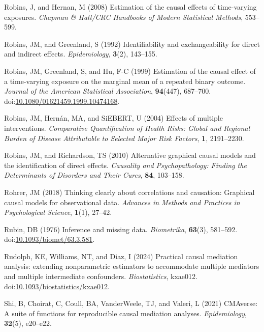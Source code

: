 \documentclass[
  single column]{article}
\newlength{\cslhangindent}
\newenvironment{CSLReferences}[2] %
 {\begin{list}{}{%
  \setlength{\itemindent}{0pt}
  \setlength{\leftmargin}{0pt}
  \setlength{\parsep}{0pt}
  \ifodd #1
   \setlength{\leftmargin}{\cslhangindent}
   \setlength{\itemindent}{-1\cslhangindent}
  \fi
  \setlength{\itemsep}{#2\baselineskip}}}
 {\end{list}}
\begin{document}
\begin{CSLReferences}{1}{0}
Robins, J, and Hernan, M (2008) Estimation of the causal effects of
time-varying exposures. \emph{Chapman \& Hall/CRC Handbooks of Modern
Statistical Methods}, 553--599.

Robins, JM, and Greenland, S (1992) Identifiability and exchangeability
for direct and indirect effects. \emph{Epidemiology}, \textbf{3}(2),
143--155.

Robins, JM, Greenland, S, and Hu, F-C (1999) Estimation of the causal
effect of a time-varying exposure on the marginal mean of a repeated
binary outcome. \emph{Journal of the American Statistical Association},
\textbf{94}(447), 687--700.
doi:\href{https://doi.org/10.1080/01621459.1999.10474168}{10.1080/01621459.1999.10474168}.

Robins, JM, Hernán, MA, and SiEBERT, U (2004) Effects of multiple
interventions. \emph{Comparative Quantification of Health Risks: Global
and Regional Burden of Disease Attributable to Selected Major Risk
Factors}, \textbf{1}, 2191--2230.

Robins, JM, and Richardson, TS (2010) Alternative graphical causal
models and the identification of direct effects. \emph{Causality and
Psychopathology: Finding the Determinants of Disorders and Their Cures},
\textbf{84}, 103--158.

Rohrer, JM (2018) Thinking clearly about correlations and causation:
Graphical causal models for observational data. \emph{Advances in
Methods and Practices in Psychological Science}, \textbf{1}(1), 27--42.

Rubin, DB (1976) Inference and missing data. \emph{Biometrika},
\textbf{63}(3), 581--592.
doi:\href{https://doi.org/10.1093/biomet/63.3.581}{10.1093/biomet/63.3.581}.

Rudolph, KE, Williams, NT, and Diaz, I (2024) {Practical causal
mediation analysis: extending nonparametric estimators to accommodate
multiple mediators and multiple intermediate confounders}.
\emph{Biostatistics}, kxae012.
doi:\href{https://doi.org/10.1093/biostatistics/kxae012}{10.1093/biostatistics/kxae012}.

Shi, B, Choirat, C, Coull, BA, VanderWeele, TJ, and Valeri, L (2021)
CMAverse: A suite of functions for reproducible causal mediation
analyses. \emph{Epidemiology}, \textbf{32}(5), e20--e22.


\end{CSLReferences}
\end{document}

